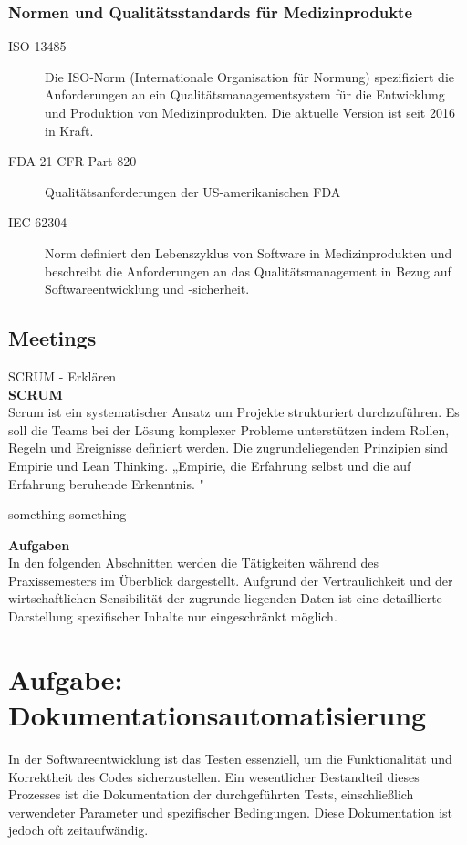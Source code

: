 \documentclass[a4paper, 12pt]{article}
\begin{document}
\subsubsection{Normen und Qualitätsstandards für Medizinprodukte}\label{mdr_norms}
\begin{description}
	\item[ISO 13485]
	Die ISO-Norm (Internationale Organisation für Normung) spezifiziert die Anforderungen an ein Qualitätsmanagementsystem für die Entwicklung und Produktion von Medizinprodukten. Die aktuelle Version ist seit 2016 in Kraft. 
	
	\item[FDA 21 CFR Part 820]
	Qualitätsanforderungen der US-amerikanischen FDA
	
	\item[IEC 62304]
	Norm definiert den Lebenszyklus von Software in Medizinprodukten und beschreibt die Anforderungen an das Qualitätsmanagement in Bezug auf Softwareentwicklung und -sicherheit.
\end{description}

\subsection{Meetings}\label{Meetings}
SCRUM - Erklären
\\ 
\textbf{SCRUM}\\
Scrum ist ein systematischer Ansatz um Projekte strukturiert durchzuführen. Es soll die Teams bei der Lösung komplexer Probleme unterstützen indem Rollen, Regeln und Ereignisse definiert werden. Die zugrundeliegenden Prinzipien sind Empirie und Lean Thinking. 
„Empirie, die Erfahrung selbst und die auf Erfahrung beruhende Erkenntnis.  
 \cite{dorsch_empirie}" 

something something  %
\cite{scrum2020}

\newpage
{\bfseries \large Aufgaben}\label{Aufgaben}\\
In den folgenden Abschnitten werden die Tätigkeiten während des Praxissemesters im Überblick dargestellt. Aufgrund der Vertraulichkeit und der wirtschaftlichen Sensibilität der zugrunde liegenden Daten ist eine detaillierte Darstellung spezifischer Inhalte nur eingeschränkt möglich.

\section{Aufgabe: Dokumentationsautomatisierung}\label{Dokumentationsautomatisierung}
In der Softwareentwicklung ist das Testen essenziell, um die Funktionalität und Korrektheit des Codes sicherzustellen.  Ein wesentlicher Bestandteil dieses Prozesses ist die Dokumentation der durchgeführten Tests, einschließlich verwendeter Parameter und spezifischer Bedingungen. Diese Dokumentation ist jedoch oft zeitaufwändig.
\end{document}
